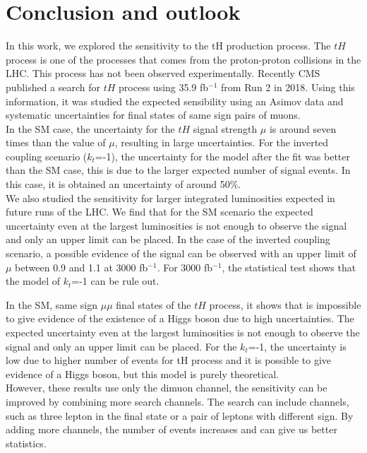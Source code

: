 
\chapter{Conclusion and outlook}
In this work, we explored the sensitivity to the tH production process.
The $tH$ process is one of the processes that comes from the proton-proton collisions in the LHC. This process has not been observed experimentally. Recently CMS published a search for $tH$ process using 35.9 fb$^{-1}$ from Run 2 in 2018. Using this information, it was studied the expected sensibility using an Asimov data and systematic uncertainties for final states of same sign pairs of muons. \\

In the SM case, the uncertainty for the $tH$ signal strength $\mu$ is around seven times than the value of $\mu$, resulting in large uncertainties. 
For the inverted coupling scenario ($k_t$=-1), the uncertainty for the model after the fit was better than the
SM case, this is due to the larger expected number of signal events. In this case, it is obtained an uncertainty of around 50$\%$.
\\

We also studied the sensitivity for larger integrated luminosities expected in future runs of the LHC. We find that for the SM scenario the expected uncertainty even at the largest luminosities is not enough to observe the signal and only an upper limit can be placed. In the case of the inverted coupling scenario, a possible evidence of the signal can be observed with an upper limit of $\mu$ between 0.9 and 1.1 at  3000 fb$^{-1}$. For  3000 fb$^{-1}$, the statistical test shows that the model of $k_t$=-1 can be rule out. 

In the SM, same sign $\mu\mu$ final states of the $tH$ process, it shows that is impossible to give evidence of the existence of a Higgs boson due to high uncertainties. The expected uncertainty even at the largest luminosities is not enough to observe the signal and only an upper limit can be placed. 
For the $k_t$=-1, the uncertainty is low due to higher number of events for tH process and it is possible to give evidence of a Higgs
boson, but this model is purely theoretical.\\

However, these results use only the dimuon channel, the sensitivity can be improved by combining more search channels. The search can include channels, such as three lepton in the final state or a pair of leptons with different sign. By adding more channels, the number of events increases and can give us better statistics. 

